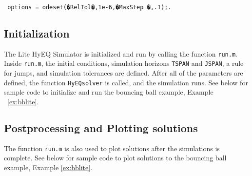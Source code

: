 \documentclass{article}
\newcommand{\ricardo}[1]{{\color{blue} #1}}
\begin{document}
\begin{verbatim} options = odeset(�RelTol�,1e-6,�MaxStep �,.1);. \end{verbatim}

\subsection{Initialization}


The Lite HyEQ Simulator is initialized and run by calling the function {\tt run.m}. Inside {\tt run.m}, the initial conditions, simulation horizons {\tt TSPAN} and {\tt JSPAN}, a rule for jumps, and simulation tolerances are defined. After all of the parameters are defined, the function {\tt HyEQsolver} is called, and the simulation runs. See below for sample code to initialize and run the bouncing ball example, Example ~\ref{ex:bblite}.\\

\label{scr:initialization}


\subsection{Postprocessing and Plotting solutions}

The function {\tt run.m} is also used to plot solutions after the simulations is complete. See below for sample code to plot solutions to the bouncing ball example, Example \ref{ex:bblite}.

\label{scr:postprocesing}
\end{document}
